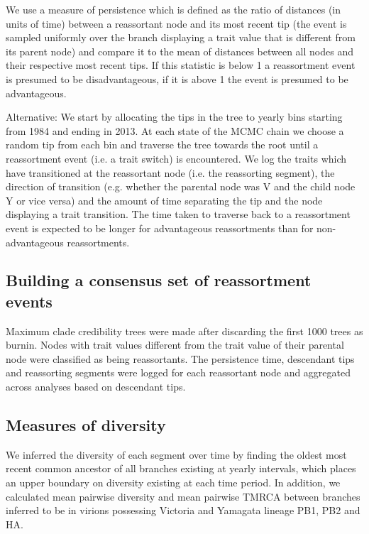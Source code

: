 \documentclass[11pt,oneside,letterpaper]{article}
\begin{document}
We use a measure of persistence which is defined as the ratio of distances (in units of time) between a reassortant node and its most recent tip (the event is sampled uniformly over the branch displaying a trait value that is different from its parent node) and compare it to the mean of distances between all nodes and their respective most recent tips. 
If this statistic is below 1 a reassortment event is presumed to be disadvantageous, if it is above 1 the event is presumed to be advantageous.

Alternative:
We start by allocating the tips in the tree to yearly bins starting from 1984 and ending in 2013. 
At each state of the MCMC chain we choose a random tip from each bin and traverse the tree towards the root until a reassortment event (i.e. a trait switch) is encountered.
We log the traits which have transitioned at the reassortant node (i.e. the reassorting segment), the direction of transition (e.g. whether the parental node was V and the child node Y or vice versa) and the amount of time separating the tip and the node displaying a trait transition. 
The time taken to traverse back to a reassortment event is expected to be longer for advantageous reassortments than for non-advantageous reassortments.


\subsection*{Building a consensus set of reassortment events}
Maximum clade credibility trees were made after discarding the first 1000 trees as burnin. 
Nodes with trait values different from the trait value of their parental node were classified as being reassortants.
The persistence time, descendant tips and reassorting segments were logged for each reassortant node and aggregated across analyses based on descendant tips.


\subsection*{Measures of diversity}
We inferred the diversity of each segment over time by finding the oldest most recent common ancestor of all branches existing at yearly intervals, which places an upper boundary on diversity existing at each time period.
In addition, we calculated mean pairwise diversity and mean pairwise TMRCA between branches inferred to be in virions possessing Victoria and Yamagata lineage PB1, PB2 and HA.
\end{document}
